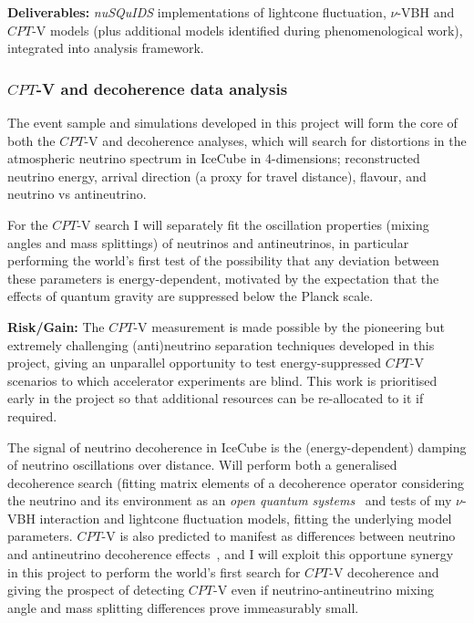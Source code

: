 \documentclass[a4paper,11pt]{article}
\begin{document}
\textbf{Deliverables:} \textit{nuSQuIDS} implementations of lightcone fluctuation, $\nu$-VBH and $CPT$-V models (plus additional models identified during phenomenological work), integrated into analysis framework.  \\

\subsubsection{$CPT$-V and decoherence data analysis}

The event sample and simulations developed in this project will form the core of both the $CPT$-V and decoherence analyses, which will search for distortions in the atmospheric neutrino spectrum in IceCube in 4-dimensions; reconstructed neutrino energy, arrival direction (a proxy for travel distance), flavour, and neutrino vs antineutrino.

For the $CPT$-V search I will separately fit the oscillation properties (mixing angles and mass splittings) of neutrinos and antineutrinos, in particular performing the world's first test of the possibility that any deviation between these parameters is energy-dependent, motivated by the expectation that the effects of quantum gravity are suppressed below the Planck scale.

\textbf{Risk/Gain:} The $CPT$-V measurement is made possible by the pioneering but extremely challenging (anti)neutrino separation techniques developed in this project, giving an unparallel opportunity to test energy-suppressed $CPT$-V scenarios to which accelerator experiments are blind. This work is prioritised early in the project so that additional resources can be re-allocated to it if required.

The signal of neutrino decoherence in IceCube is the (energy-dependent) damping of neutrino oscillations over distance. Will perform both a generalised decoherence search (fitting matrix elements of a decoherence operator considering the neutrino and its environment as an \textit{open quantum systems}~\cite{lindblad1976, Benatti_2000, gago2002study, PhysRevLett.85.1166} and tests of my $\nu$-VBH interaction and lightcone fluctuation models, fitting the underlying model parameters. $CPT$-V is also predicted to manifest as differences between neutrino and antineutrino decoherence effects~\cite{Mavromatos_2009, Barenboim:2004wu, Carrasco:2018sca, Buoninfante:2020iyr, Capolupo:2020myw}, and I will exploit this opportune synergy in this project to perform the world's first search for $CPT$-V decoherence and giving the prospect of detecting $CPT$-V even if neutrino-antineutrino mixing angle and mass splitting differences prove immeasurably small. 
\end{document}
